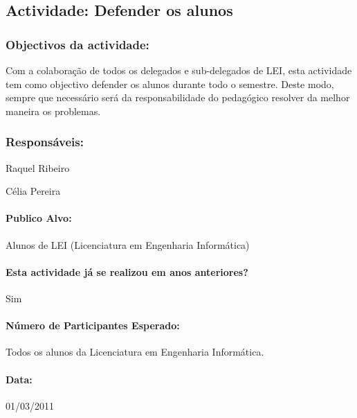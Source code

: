 \subsection{Actividade: Defender os alunos} %

\subsubsection*{Objectivos da actividade:}

Com a colaboração de todos os delegados e sub-delegados de LEI, esta actividade tem como objectivo defender os alunos durante todo o semestre. Deste modo, sempre que necessário será da responsabilidade do pedagógico resolver da melhor maneira os problemas.

\subsubsection*{Responsáveis:}
\begin{itemizedash}
	\item{Raquel Ribeiro}
	\item{Célia Pereira}
\end{itemizedash}

\paragraph{Publico Alvo: }
Alunos de LEI (Licenciatura em Engenharia Informática)

\paragraph{Esta actividade já se realizou em anos anteriores?}
Sim

\paragraph{Número de Participantes Esperado:}
Todos os alunos da Licenciatura em Engenharia Informática.

\paragraph{Data:} 01/03/2011


